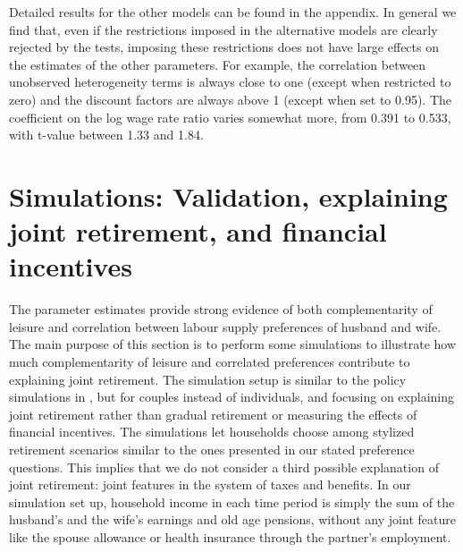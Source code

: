 \documentclass[11pt,letter]{article}
\begin{document}
Detailed results for the other models can be found in the appendix. In general we find that, even if the restrictions imposed in the alternative models are clearly rejected by the tests, imposing these restrictions does not have large effects on the estimates of the other parameters. For example, the correlation between unobserved heterogeneity terms is always close to one (except when restricted to zero) and the discount factors are always above 1 (except when set to 0.95). The coefficient on the log wage rate ratio varies somewhat more, from 0.391 to 0.533, with t-value between 1.33 and 1.84.


\section{Simulations: Validation, explaining joint retirement, and financial incentives}

\par The parameter estimates provide strong evidence of both complementarity of leisure and correlation between labour supply preferences of husband and wife. The main purpose of this section is to perform some simulations to illustrate how much complementarity of leisure and correlated preferences contribute to explaining joint retirement. The simulation setup is similar to the policy simulations in \citet{vsoest2014}, but for couples instead of individuals, and focusing on explaining joint retirement rather than gradual retirement or measuring the effects of financial incentives. The simulations let households choose among stylized retirement scenarios similar to the ones presented in our stated preference questions. This implies that we do not consider a third possible explanation of joint retirement: joint features in the system of taxes and benefits. In our simulation set up, household income in each time period is simply the sum of the husband's and the wife's earnings and old age pensions, without any joint feature like the spouse allowance or health insurance through the partner's employment.
\end{document}
